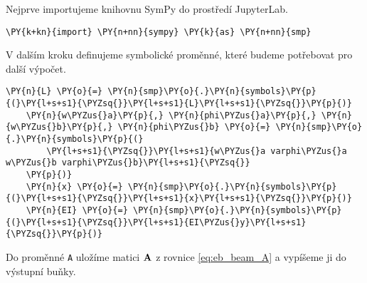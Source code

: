 Nejprve importujeme knihovnu SymPy do prostředí JupyterLab.

\begin{tcolorbox}[breakable, size=fbox, boxrule=1pt, pad at break*=1mm,colback=cellbackground, colframe=cellborder]
    \begin{Verbatim}[commandchars=\\\{\}]
    \PY{k+kn}{import} \PY{n+nn}{sympy} \PY{k}{as} \PY{n+nn}{smp}
    \end{Verbatim}
\end{tcolorbox}

V dalším kroku definujeme symbolické proměnné, které budeme potřebovat pro další výpočet.

\begin{tcolorbox}[breakable, size=fbox, boxrule=1pt, pad at break*=1mm,colback=cellbackground, colframe=cellborder]
    \begin{Verbatim}[commandchars=\\\{\}]
    \PY{n}{L} \PY{o}{=} \PY{n}{smp}\PY{o}{.}\PY{n}{symbols}\PY{p}{(}\PY{l+s+s1}{\PYZsq{}}\PY{l+s+s1}{L}\PY{l+s+s1}{\PYZsq{}}\PY{p}{)}
    \PY{n}{w\PYZus{}a}\PY{p}{,} \PY{n}{phi\PYZus{}a}\PY{p}{,} \PY{n}{w\PYZus{}b}\PY{p}{,} \PY{n}{phi\PYZus{}b} \PY{o}{=} \PY{n}{smp}\PY{o}{.}\PY{n}{symbols}\PY{p}{(}
        \PY{l+s+s1}{\PYZsq{}}\PY{l+s+s1}{w\PYZus{}a varphi\PYZus{}a w\PYZus{}b varphi\PYZus{}b}\PY{l+s+s1}{\PYZsq{}}
    \PY{p}{)}
    \PY{n}{x} \PY{o}{=} \PY{n}{smp}\PY{o}{.}\PY{n}{symbols}\PY{p}{(}\PY{l+s+s1}{\PYZsq{}}\PY{l+s+s1}{x}\PY{l+s+s1}{\PYZsq{}}\PY{p}{)}
    \PY{n}{EI} \PY{o}{=} \PY{n}{smp}\PY{o}{.}\PY{n}{symbols}\PY{p}{(}\PY{l+s+s1}{\PYZsq{}}\PY{l+s+s1}{EI\PYZus{}y}\PY{l+s+s1}{\PYZsq{}}\PY{p}{)}
    \end{Verbatim}
\end{tcolorbox}
        
Do proměnné \texttt{A} uložíme matici $\mathbf{A}$ z rovnice \ref{eq:eb_beam_A} a vypíšeme ji do výstupní buňky.

